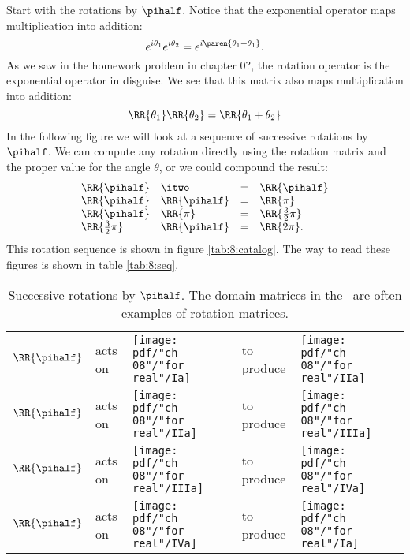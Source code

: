 Start with the rotations by $\pihalf$. Notice that the exponential operator maps multiplication into addition:
\begin{equation}
  e^{i \theta_{1}} e^{i \theta_{2}} = e^{i \paren{\theta_{1} + \theta_{1}}}.
\end{equation}
As we saw in the homework problem in chapter 0?, the rotation operator is the exponential operator in disguise. We see that this matrix also maps multiplication into addition:
\begin{equation}
  \RR{\theta_{1}}\RR{\theta_{2}} = \RR{\theta_{1} + \theta_{2}}
\end{equation}
In the following figure we will look at a sequence of successive rotations by $\pihalf$. We can compute any rotation directly using the rotation matrix and the proper value for the angle $\theta$, or we could compound the result:
\begin{equation}
  \begin{array}{llcl}
     \RR{\pihalf} & \itwo &=& \RR{\pihalf} \\
     \RR{\pihalf} & \RR{\pihalf} &=& \RR{\pi} \\
     \RR{\pihalf} & \RR{\pi} &=& \RR{\frac{3}{2}\pi} \\
     \RR{\frac{3}{2}\pi} & \RR{\pihalf} &=& \RR{2\pi}.
  \end{array}
\end{equation}
This rotation sequence is shown in figure \eqref{tab:8:catalog}. The way to read these figures is shown in table \eqref{tab:8:seq}.
\begin{table}[htdp]
\begin{center}
\begin{tabular}{m{0.25in}m{0.45in}m{0.5in}m{0.65in}m{0.5in}}
$\RR{\pihalf}$  & acts on & 
\texttt{[image: pdf/"ch 08"/"for real"/Ia]} & to produce & 
\texttt{[image: pdf/"ch 08"/"for real"/IIa]} \\
$\RR{\pihalf}$  & acts on & 
\texttt{[image: pdf/"ch 08"/"for real"/IIa]} & to produce & 
\texttt{[image: pdf/"ch 08"/"for real"/IIIa]} \\
$\RR{\pihalf}$  & acts on & 
\texttt{[image: pdf/"ch 08"/"for real"/IIIa]} & to produce & 
\texttt{[image: pdf/"ch 08"/"for real"/IVa]} \\
$\RR{\pihalf}$  & acts on & 
\texttt{[image: pdf/"ch 08"/"for real"/IVa]} & to produce & 
\texttt{[image: pdf/"ch 08"/"for real"/Ia]} \\
\end{tabular}
\end{center}
\caption[Successive rotations by $\pihalf$]{Successive rotations by $\pihalf$. The domain matrices in the \svdl \ are often examples of rotation matrices.}
\label{tab:8:seq}
\end{table}%

